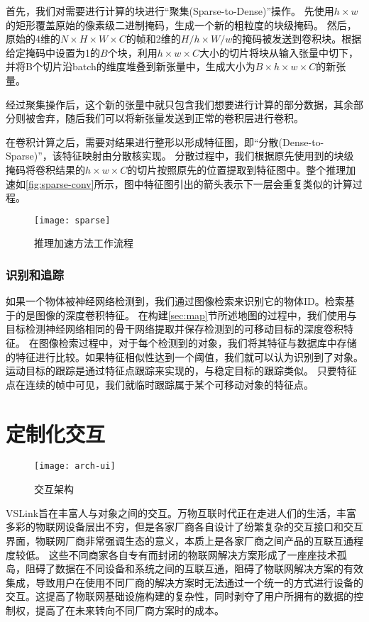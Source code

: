 首先，我们对需要进行计算的块进行“聚集(Sparse-to-Dense)”操作。
先使用$h\times w$的矩形覆盖原始的像素级二进制掩码，生成一个新的粗粒度的块级掩码。
然后，原始的4维的$N \times H \times W \times C$的帧和2维的$H/h \times W/w$的掩码被发送到卷积块。根据给定掩码中设置为1的$B$个块，利用$h\times w \times C$大小的切片将块从输入张量中切下，并将B个切片沿batch的维度堆叠到新张量中，生成大小为$B\times h \times w \times C$的新张量。

经过聚集操作后，这个新的张量中就只包含我们想要进行计算的部分数据，其余部分则被舍弃，随后我们可以将新张量发送到正常的卷积层进行卷积。

在卷积计算之后，需要对结果进行整形以形成特征图，即“分散(Dense-to-Sparse)”，该特征映射由分散核实现。
分散过程中，我们根据原先使用到的块级掩码将卷积结果的$h\times w \times C$的切片按照原先的位置提取到特征图中。整个推理加速如\autoref{fig:sparse-conv}所示，图中特征图引出的箭头表示下一层会重复类似的计算过程。

\begin{figure}[htbp]
	\centering
	\texttt{[image: sparse]}
	\caption{推理加速方法工作流程}
	\label{fig:sparse-conv}
\end{figure}

\subsection{识别和追踪}
如果一个物体被神经网络检测到，我们通过图像检索来识别它的物体ID。检索基于的是图像的深度卷积特征。
在构建\ref{sec:map}节所述地图的过程中，我们使用与目标检测神经网络相同的骨干网络提取并保存检测到的可移动目标的深度卷积特征。
在图像检索过程中，对于每个检测到的对象，我们将其特征与数据库中存储的特征进行比较。如果特征相似性达到一个阈值，我们就可以认为识别到了对象。
运动目标的跟踪是通过特征点跟踪来实现的，与稳定目标的跟踪类似。
只要特征点在连续的帧中可见，我们就临时跟踪属于某个可移动对象的特征点。


\chapter{定制化交互}
\label{chap:flexible}

\begin{figure}[htbp]
	\centering
	\texttt{[image: arch-ui]}
	\caption{交互架构}
	\label{fig:arch-ui}
\end{figure}

VSLink旨在丰富人与对象之间的交互。万物互联时代正在走进人们的生活，丰富多彩的物联网设备层出不穷，但是各家厂商各自设计了纷繁复杂的交互接口和交互界面，物联网厂商非常强调生态的意义，本质上是各家厂商之间产品的互联互通程度较低。
这些不同商家各自专有而封闭的物联网解决方案形成了一座座技术孤岛，阻碍了数据在不同设备和系统之间的互联互通，阻碍了物联网解决方案的有效集成，导致用户在使用不同厂商的解决方案时无法通过一个统一的方式进行设备的交互。这提高了物联网基础设施构建的复杂性，同时剥夺了用户所拥有的数据的控制权，提高了在未来转向不同厂商方案时的成本。

